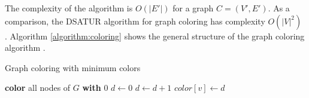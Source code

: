 The complexity of the algorithm is $O(|E'|)$ for a graph $C = (V',E')$.
As a comparison, the DSATUR algorithm for graph coloring has complexity $O(|V|^2)$ \citep{brelaz1979new}.
Algorithm \autoref{algorithm:coloring} shows the general structure of the graph coloring algorithm  \citep{mittal2011graph}.

\begin{algorithm}
\caption{Graph coloring with minimum colors}\label{algorithm:coloring}
\begin{algorithmic}[1]


\State \textbf{color} all nodes of $G$ \textbf{with} 0
\State $d \gets 0$
			\State $d \gets d+1$
		\EndIf
		\State $color[v] \gets d$
	\EndIf
\EndFor


\EndFunction
\end{algorithmic}
\end{algorithm}


